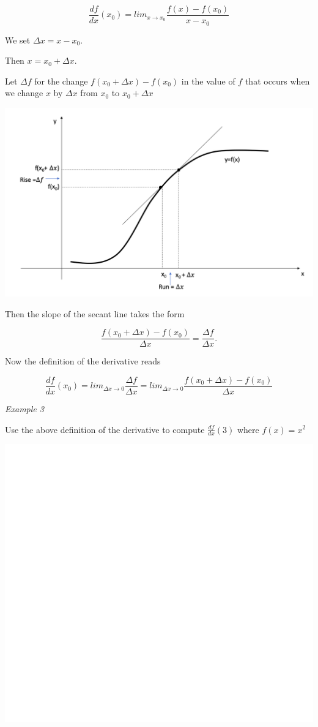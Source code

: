 \documentclass[]{book}
\begin{document}
\[\frac{df}{dx}(x_0)= lim_{x\to x_{0}}\frac{f(x)-f(x_0)}{x-x_0}\]

We set \(\Delta x = x-x_0.\)

Then \(x = x_0+ \Delta x\).

Let \(\Delta f\) for the change \(f(x_0 + \Delta x) - f(x_0)\) in the value of \(f\) that occurs when we change \(x\) by \(\Delta x\) from \(x_0\) to \(x_0+\Delta x\)

\begin{center}\includegraphics[width=0.7\linewidth]{figure/5Derivatives-11} \end{center}

Then the slope of the secant line takes the form

\[\frac{f(x_0 +\Delta x)-f(x_0)}{\Delta x }= \frac{\Delta f}{\Delta x}.\]

Now the definition of the derivative reads

\[\frac{df}{dx} (x_0) = lim_{\Delta x\to 0}\frac{\Delta f}{\Delta x}= lim_{\Delta x\to 0} \frac{f(x_0 +\Delta x)-f(x_0)}{\Delta x }\]

\newpage

\emph{Example 3}

Use the above definition of the derivative to compute \(\frac{df}{dx}(3)\) where \(f(x)=x^2\)

\begin{center}\includegraphics[width=1\linewidth]{figure/LB1-1} \end{center}
\end{document}
